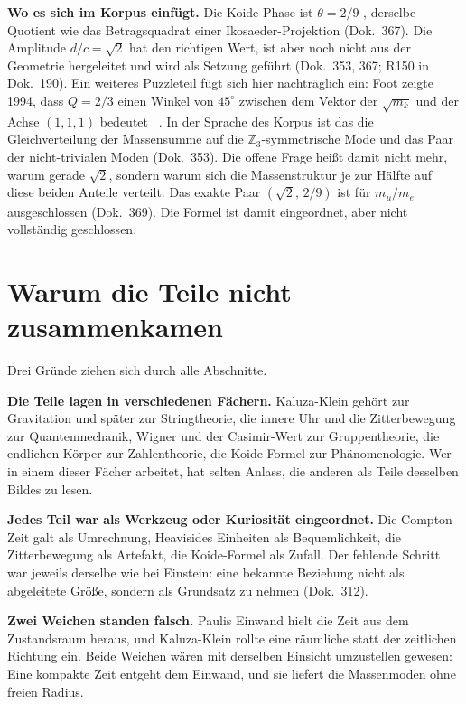 \textbf{Wo es sich im Korpus einfügt.} Die Koide-Phase ist $\theta=2/9$ \BM, derselbe Quotient wie das
Betragsquadrat einer Ikosaeder-Projektion (Dok.~367). Die Amplitude $d/c=\sqrt2$ hat den
richtigen Wert, ist aber noch nicht aus der Geometrie hergeleitet und wird als Setzung geführt
\SM{} (Dok.~353, 367; R150 in Dok.~190). Ein weiteres Puzzleteil fügt sich hier nachträglich ein:
Foot zeigte 1994, dass $Q=2/3$ einen Winkel von $45^\circ$ zwischen dem Vektor der $\sqrt{m_k}$
und der Achse $(1,1,1)$ bedeutet \QM~\cite{Foot1994}. In der Sprache des Korpus ist das die
Gleichverteilung der Massensumme auf die $\mathbb{Z}_3$-symmetrische Mode und das Paar der
nicht-trivialen Moden \BM{} (Dok.~353). Die offene Frage heißt damit nicht mehr, warum gerade
$\sqrt2$, sondern warum sich die Massenstruktur je zur Hälfte auf diese beiden Anteile verteilt.
Das exakte Paar $(\sqrt2,\,2/9)$ ist für $m_\mu/m_e$ ausgeschlossen (Dok.~369). Die Formel ist
damit eingeordnet, aber nicht vollständig geschlossen.

\section{Warum die Teile nicht zusammenkamen}

Drei Gründe ziehen sich durch alle Abschnitte.

\textbf{Die Teile lagen in verschiedenen Fächern.} Kaluza-Klein gehört zur Gravitation und später
zur Stringtheorie, die innere Uhr und die Zitterbewegung zur Quantenmechanik, Wigner und der
Casimir-Wert zur Gruppentheorie, die endlichen Körper zur Zahlentheorie, die Koide-Formel zur
Phänomenologie. Wer in einem dieser Fächer arbeitet, hat selten Anlass, die anderen als Teile
desselben Bildes zu lesen.

\textbf{Jedes Teil war als Werkzeug oder Kuriosität eingeordnet.} Die Compton-Zeit galt als
Umrechnung, Heavisides Einheiten als Bequemlichkeit, die Zitterbewegung als Artefakt, die
Koide-Formel als Zufall. Der fehlende Schritt war jeweils derselbe wie bei Einstein: eine bekannte
Beziehung nicht als abgeleitete Größe, sondern als Grundsatz zu nehmen (Dok.~312).

\textbf{Zwei Weichen standen falsch.} Paulis Einwand hielt die Zeit aus dem Zustandsraum heraus,
und Kaluza-Klein rollte eine räumliche statt der zeitlichen Richtung ein. Beide Weichen wären mit
derselben Einsicht umzustellen gewesen: Eine kompakte Zeit entgeht dem Einwand, und sie liefert die
Massenmoden ohne freien Radius.


